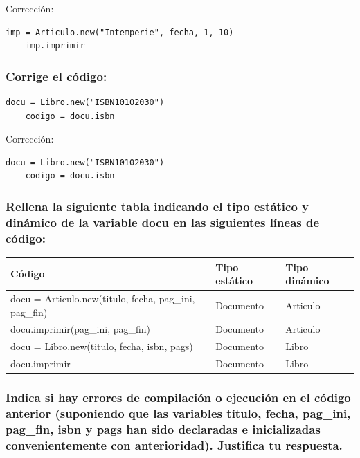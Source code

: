 \documentclass[a4paper,12pt]{article}
\begin{document}
Corrección:
\begin{lstlisting}[style=customrb, caption={Corrección del código}]
    imp = Articulo.new("Intemperie", fecha, 1, 10)
    imp.imprimir
\end{lstlisting}

\subsubsection*{Corrige el código:}
    \begin{lstlisting}[style=customrb, caption = {Código a corregir}]
    docu = Libro.new("ISBN10102030")
    codigo = docu.isbn
    \end{lstlisting}

Corrección:
\begin{lstlisting}[style=customrb, caption={Corrección del código}]
    docu = Libro.new("ISBN10102030")
    codigo = docu.isbn
\end{lstlisting}

\subsubsection*{Rellena la siguiente tabla indicando el tipo estático y dinámico de la variable docu en las siguientes líneas de código:}
    
    \begin{table}[H]
        \centering
        \begin{tabular}{|p{6cm}|l|l|}
            \hline
            \textbf{Código} & \textbf{Tipo estático} & \textbf{Tipo dinámico} \\ \hline
            docu = Articulo.new(titulo, fecha, pag\_ini, pag\_fin) & Documento & Articulo \\ \hline
            docu.imprimir(pag\_ini, pag\_fin) & Documento & Articulo \\ \hline
            docu = Libro.new(titulo, fecha, isbn, pags) & Documento & Libro \\ \hline
            docu.imprimir & Documento & Libro \\ \hline
        \end{tabular}
    \end{table}

\subsubsection*{Indica si hay errores de compilación o ejecución en el código anterior (suponiendo que las variables titulo, fecha, pag\_ini, pag\_fin, isbn y pags han sido declaradas e inicializadas convenientemente con anterioridad). Justifica tu respuesta.}
\end{document}
